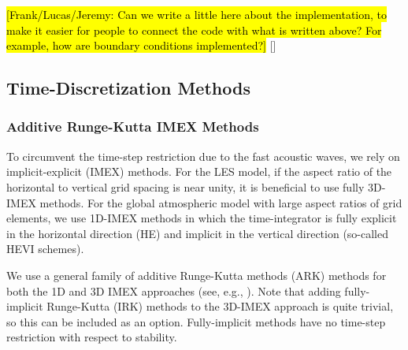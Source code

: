 \documentclass{article}
\begin{document}
\hl{[Frank/Lucas/Jeremy: Can we write a little here about the implementation, to make it easier for people to connect the code with what is written above? For example, how are boundary conditions implemented?]} 
[]

\subsection{Time-Discretization Methods}\label{s:timestepping}

\subsubsection{Additive Runge-Kutta IMEX Methods}

To circumvent the time-step restriction due to the fast acoustic waves, we rely on implicit-explicit (IMEX) methods. For the LES model, if the aspect ratio of the horizontal to vertical grid spacing is near unity, it is beneficial to use fully 3D-IMEX methods.  For the global atmospheric model with large aspect ratios of grid elements, we use 1D-IMEX methods in which the time-integrator is fully explicit in the horizontal direction (HE) and implicit in the vertical direction (so-called HEVI schemes).

We use a general family of additive Runge-Kutta methods (ARK) methods for both the 1D and 3D IMEX approaches (see, e.g., \citet{giraldo:2013}). Note that adding fully-implicit Runge-Kutta (IRK) methods to the 3D-IMEX approach is quite trivial, so this can be included as an option. Fully-implicit methods have no time-step restriction with respect to stability.
\end{document}
